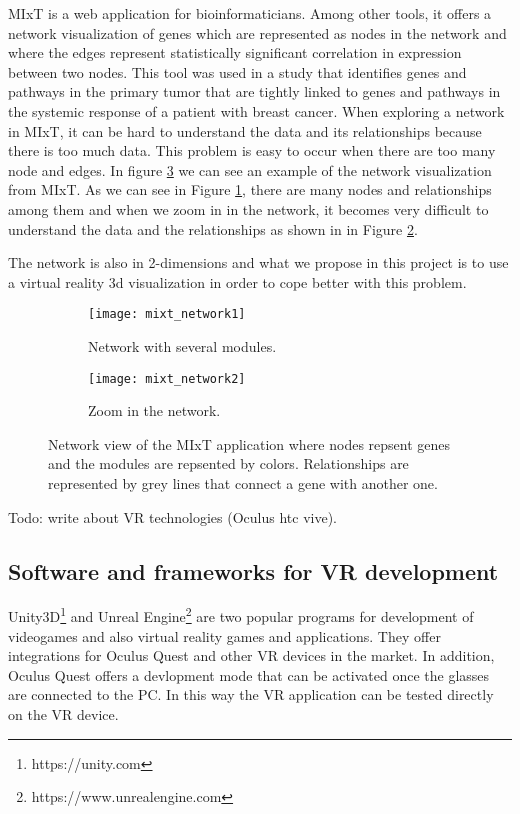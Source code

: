 MIxT\cite{fjukstad_dumeaux_olsen_lund_hallett_bongo_2017} is a web application for bioinformaticians. Among other tools, it offers a network visualization of genes which are represented as nodes in the network and where the edges represent statistically significant correlation in expression between two nodes. This tool was used in a study\cite{dumeaux_fjukstad_interactions_tumor_blood} that identifies genes and pathways in the primary tumor that are tightly linked to genes and pathways in the systemic response of a patient with breast cancer.
When exploring a network in MIxT, it can be hard to understand the data and its relationships because there is too much data. This problem is easy to occur when there are too many node and edges. In figure \ref{fig:mixt_network} we can see an example of the network visualization from MIxT. As we can see in Figure \ref{fig:mixt_network1}, there are many nodes and relationships among them and when we zoom in in the network, it becomes very difficult to understand the data and the relationships as shown in in Figure \ref{fig:mixt_network_zoom}.

 The network is also in 2-dimensions and what we propose in this project is to use a virtual reality 3d visualization in order to cope better with this problem.

\begin{figure}[h!]
    \centering%
    \begin{subfigure}[t]{0.5\textwidth}
        \centering%
        \texttt{[image: mixt\_network1]}
        \caption{Network with several modules.}
        \label{fig:mixt_network1}
    \end{subfigure}%
    \begin{subfigure}[t]{0.5\textwidth}
        \centering%
        \texttt{[image: mixt\_network2]}
        \caption{Zoom in the network.}
        \label{fig:mixt_network_zoom}
    \end{subfigure}

    \caption{Network view of the MIxT application where nodes repsent genes and the modules are repsented by colors. Relationships are represented by grey lines that connect a gene with another one.}
    \label{fig:mixt_network}
\end{figure}

Todo: write about VR technologies (Oculus htc vive).

\subsection{Software and frameworks for VR development}
Unity3D\footnote{https://unity.com} and Unreal Engine\footnote{https://www.unrealengine.com} are two popular programs for development of videogames and also virtual reality games and applications. They offer integrations for Oculus Quest and other VR devices in the market. In addition, Oculus Quest offers a devlopment mode that can be activated once the glasses are connected to the PC. In this way the VR application can be tested directly on the VR device.

